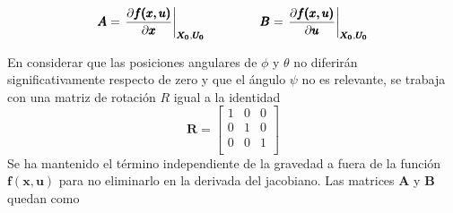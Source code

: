 \documentclass[twoside,11pt]{book}
\begin{document}
\begin{equation}
\pmb{A}=\left.{\frac{\partial \pmb{f(x,u)}}{\partial \pmb{x}}}\right\vert_{\pmb{X_0},\pmb{U_0}} \hspace*{1.5cm} \pmb{B}=\left.{\frac{\partial \pmb{f(x,u)}}{\partial \pmb{u}}}\right\vert_{\pmb{X_0},\pmb{U_0}}
\label{jacobians}
\end{equation}

En considerar que las posiciones angulares de $\phi$ y $\theta$ no diferirán significativamente respecto de zero y que el ángulo $\psi$ no es relevante, se trabaja con una matriz de rotación $R$ igual a la identidad
\begin{equation}
\pmb{R}=\left[\begin{array}{ccc}
1 & 0 & 0 \\
0 & 1 & 0 \\
0 & 0 & 1 \\ \end{array} \right]
\end{equation}
Se ha mantenido el término independiente de la gravedad a fuera de la función $\pmb{f(x,u)}$ para no eliminarlo en la derivada del jacobiano. Las matrices $\pmb{A}$ y $\pmb{B}$ quedan como
\end{document}
